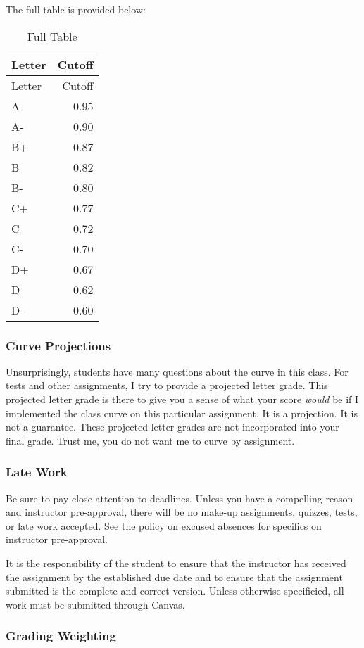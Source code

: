 \documentclass[11pt,]{article}
\begin{document}
The full table is provided below:

\begin{longtable}[]{@{}lr@{}}
\caption{Full Table}\tabularnewline
\toprule
Letter & Cutoff\tabularnewline
\midrule
\endfirsthead
\toprule
Letter & Cutoff\tabularnewline
\midrule
\endhead
A & 0.95\tabularnewline
A- & 0.90\tabularnewline
B+ & 0.87\tabularnewline
B & 0.82\tabularnewline
B- & 0.80\tabularnewline
C+ & 0.77\tabularnewline
C & 0.72\tabularnewline
C- & 0.70\tabularnewline
D+ & 0.67\tabularnewline
D & 0.62\tabularnewline
D- & 0.60\tabularnewline
\bottomrule
\end{longtable}

\hypertarget{curve-projections}{%
\subsubsection{Curve Projections}\label{curve-projections}}

Unsurprisingly, students have many questions about the curve in this
class. For tests and other assignments, I try to provide a projected
letter grade. This projected letter grade is there to give you a sense
of what your score \emph{would} be if I implemented the class curve on
this particular assignment. It is a projection. It is not a guarantee.
These projected letter grades are not incorporated into your final
grade. Trust me, you do not want me to curve by assignment.

\hypertarget{late-work}{%
\subsubsection{Late Work}\label{late-work}}

Be sure to pay close attention to deadlines. Unless you have a
compelling reason and instructor pre-approval, there will be no make-up
assignments, quizzes, tests, or late work accepted. See the policy on
excused absences for specifics on instructor pre-approval.

It is the responsibility of the student to ensure that the instructor
has received the assignment by the established due date and to ensure
that the assignment submitted is the complete and correct version.
Unless otherwise specificied, all work must be submitted through Canvas.

\hypertarget{grading-weighting}{%
\subsubsection{Grading Weighting}\label{grading-weighting}}
\end{document}
